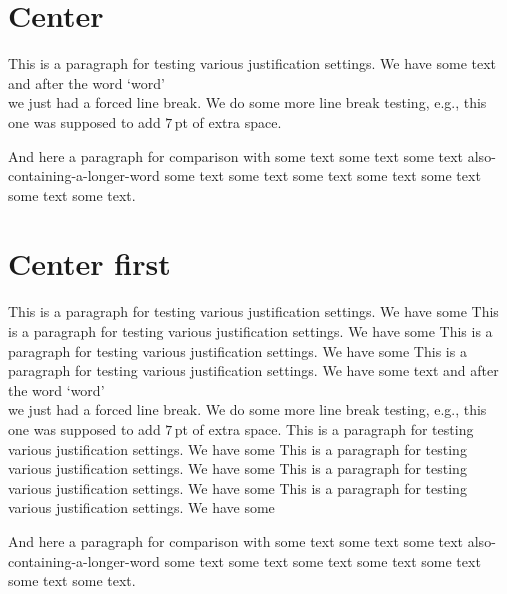 \documentclass{article}
\begin{document}
\section{Center}

This is a paragraph for testing various justification settings. We have some
text and after the word `word' \\ we just had a forced line break. We
do some more line break testing, e.g., this\\[7pt] one was supposed to
add $7$\,pt of extra space.

And here a paragraph for comparison with some text some text some text
also-containing-a-longer-word some text some text some text some text
some text some text some text.

\section{Center first}

This is a paragraph for testing various justification settings. We have some
This is a paragraph for testing various justification settings. We have some
This is a paragraph for testing various justification settings. We have some
This is a paragraph for testing various justification settings. We have some
text and after the word `word' \\ we just had a forced line break. We
do some more line break testing, e.g., this\\[7pt] one was supposed to
add $7$\,pt of extra space.
This is a paragraph for testing various justification settings. We have some
This is a paragraph for testing various justification settings. We have some
This is a paragraph for testing various justification settings. We have some
This is a paragraph for testing various justification settings. We have some

And here a paragraph for comparison with some text some text some text
also-containing-a-longer-word some text some text some text some text
some text some text some text.
\end{document}
